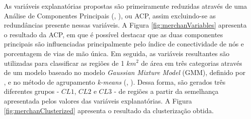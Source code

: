 As variáveis explanatórias propostas são primeiramente reduzidas através de uma Análise de Componentes Principais (, \citeyear{pearson1901liii}), ou ACP, assim excluindo-se as redundâncias presente nessas variáveis.
A Figura \ref{fig:merchanVariables} apresenta o resultado da ACP, em que é possível destacar que as duas componentes principais são influenciadas principalmente pelo índice de conectividade de nós e porcentagem de vias de mão única.
%
Em seguida, as variáveis resultantes são utilizadas para classificar as regiões de 1 $km^{2}$ de área em três categorias através de um modelo baseado no modelo \textit{Gaussian Mixture Model} (GMM), definido por , e no método de agrupamento \textit{k-means} (, \citeyear{macqueen1967classification}).
Dessa forma, são gerados três diferentes grupos - $CL1$, $CL2$ e $CL3$ - de regiões a partir da semelhança apresentada pelos valores das variáveis explanatórias.
A Figura \ref{fig:merchanClusterized} apresenta o resultado da clusterização obtida.
%
